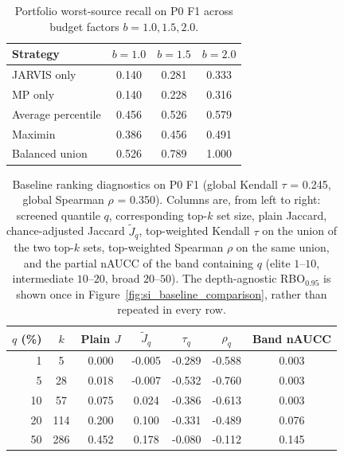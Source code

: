 \documentclass[11pt]{article}
\begin{document}
\begin{table}[htbp]
\small
\setlength{\tabcolsep}{4pt}
\centering
\caption{Portfolio worst-source recall on P0 F1 across budget factors $b=1.0, 1.5, 2.0$.}
\label{tab:si_budget}
\begin{tabular}{lccc}
\toprule
Strategy & $b=1.0$ & $b=1.5$ & $b=2.0$ \\
\midrule
JARVIS only & 0.140 & 0.281 & 0.333 \\
MP only & 0.140 & 0.228 & 0.316 \\
Average percentile & 0.456 & 0.526 & 0.579 \\
Maximin & 0.386 & 0.456 & 0.491 \\
Balanced union & 0.526 & 0.789 & 1.000 \\
\bottomrule
\end{tabular}
\end{table}


\begin{table}[htbp]
\small
\setlength{\tabcolsep}{3pt}
\centering
\caption{Baseline ranking diagnostics on P0 F1 (global Kendall $\tau$ = 0.245, global Spearman $\rho$ = 0.350).
Columns are, from left to right: screened quantile $q$, corresponding top-$k$ set size, plain Jaccard, chance-adjusted Jaccard $\widetilde J_q$, top-weighted Kendall $\tau$ on the union of the two top-$k$ sets, top-weighted Spearman $\rho$ on the same union, and the partial nAUCC of the band containing $q$ (elite $1$--$10$, intermediate $10$--$20$, broad $20$--$50$). The depth-agnostic RBO$_{0.95}$ is shown once in Figure~\ref{fig:si_baseline_comparison}, rather than repeated in every row.}
\label{tab:si_baseline_metrics}
\begin{tabular}{rcccccc}
\toprule
$q$ (\%) & $k$ & Plain $J$ & $\widetilde J_q$ & $\tau_{q}$ & $\rho_{q}$ & Band nAUCC \\
\midrule
1 & 5 & 0.000 & -0.005 & -0.289 & -0.588 & 0.003 \\
5 & 28 & 0.018 & -0.007 & -0.532 & -0.760 & 0.003 \\
10 & 57 & 0.075 & 0.024 & -0.386 & -0.613 & 0.003 \\
20 & 114 & 0.200 & 0.100 & -0.331 & -0.489 & 0.076 \\
50 & 286 & 0.452 & 0.178 & -0.080 & -0.112 & 0.145 \\
\bottomrule
\end{tabular}
\end{table}
\end{document}

